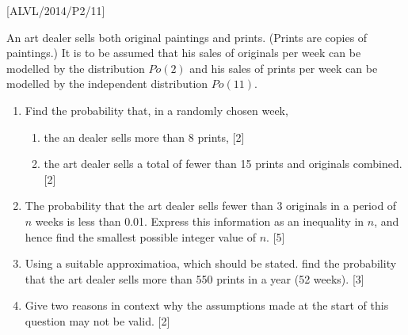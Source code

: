 \item {[}ALVL/2014/P2/11{]}

An art dealer sells both original paintings and prints. (Prints are
copies of paintings.) It is to be assumed that his sales of originals
per week can be modelled by the distribution $Po\left(2\right)$ and
his sales of prints per week can be modelled by the independent distribution
$Po\left(11\right)$. 
\begin{enumerate}
\item Find the probability that, in a randomly chosen week, 
\begin{enumerate}
\item the an dealer sells more than 8 prints,\hfill{} {[}2{]}
\item the art dealer sells a total of fewer than 15 prints and originals
combined. \hfill{}{[}2{]}
\end{enumerate}
\item The probability that the art dealer sells fewer than 3 originals in
a period of $n$ weeks is less than 0.01. Express this information
as an inequality in $n$, and hence find the smallest possible integer
value of $n$.\hfill{} {[}5{]}
\item Using a suitable approximatioa, which should be stated. find the probability
that the art dealer sells more than 550 prints in a year (52 weeks).\hfill{}
{[}3{]}
\item Give two reasons in context why the assumptions made at the start
of this question may not be valid. \hfill{}{[}2{]}
\end{enumerate}
